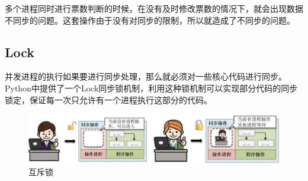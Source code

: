 多个进程同时进行票数判断的时候，在没有及时修改票数的情况下，就会出现数据不同步的问题。这套操作由于没有对同步的限制，所以就造成了不同步的问题。\\

\subsection{Lock}

并发进程的执行如果要进行同步处理，那么就必须对一些核心代码进行同步。Python中提供了一个Lock同步锁机制，利用这种锁机制可以实现部分代码的同步锁定，保证每一次只允许有一个进程执行这部分的代码。

\begin{figure}[H]
	\centering
	\includegraphics[]{img/C11/11-6/1.png}
	\caption{互斥锁}
\end{figure}

\begin{table}[H]
	\centering
	\caption{Lock类}
\end{table}


